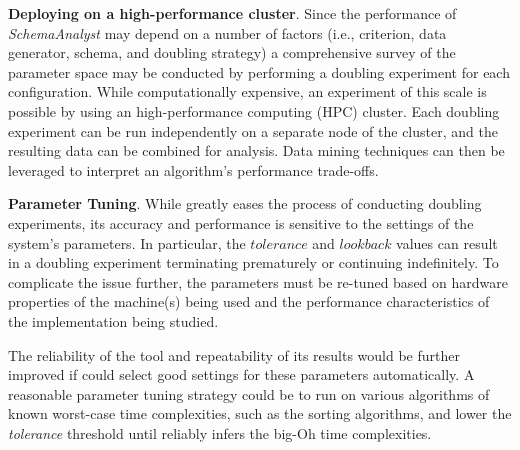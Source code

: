 

{\bf Deploying on a high-performance cluster}.  Since the performance of
\textit{SchemaAnalyst} may depend on a number of factors (i.e., criterion, data
generator, schema, and doubling strategy) a comprehensive survey of the
parameter space may be conducted by performing a doubling experiment for each
configuration. While computationally expensive, an experiment of this scale is
possible by using an high-performance computing (HPC) cluster. Each doubling
experiment can be run independently on a separate node of the cluster, and the
resulting data can be combined for analysis. Data mining techniques can then be
leveraged to interpret an algorithm's performance trade-offs.


 {\bf Parameter Tuning}.  While \toolname greatly eases the process of
 conducting doubling experiments, its accuracy and performance is sensitive to
 the settings of the system's parameters.  In particular, the
 $\mathit{tolerance}$ and $\mathit{lookback}$ values can result in a doubling
 experiment terminating prematurely or continuing indefinitely.  To complicate
 the issue further, the parameters must be re-tuned based on hardware
 properties of the machine(s) being used and the performance characteristics of
 the implementation being studied.

  The reliability of the tool and repeatability of its results would be further
  improved if \toolname could select good settings for these parameters
  automatically. A reasonable parameter tuning strategy could be to run
  \toolname on various algorithms of known worst-case time complexities, such
  as the sorting algorithms, and lower the \textit{tolerance} threshold until
  \toolname reliably infers the big-Oh time complexities.

